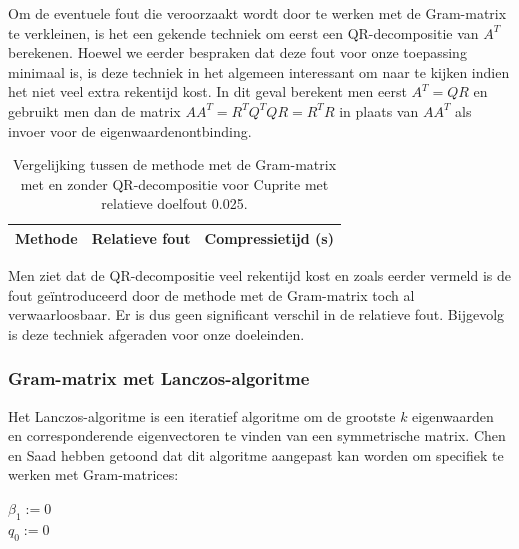 Om de eventuele fout die veroorzaakt wordt door te werken met de Gram-matrix te verkleinen, is het een gekende techniek om eerst een QR-decompositie van $A^T$ berekenen. Hoewel we eerder bespraken dat deze fout voor onze toepassing minimaal is, is deze techniek in het algemeen interessant om naar te kijken indien het niet veel extra rekentijd kost. In dit geval berekent men eerst $A^T = QR$ en gebruikt men dan de matrix $A A^T = R^T Q^T Q R = R^T R$ in plaats van $A A^T$ als invoer voor de eigenwaardenontbinding.\\

\begin{table}[H]
\centering
\begin{tabular}{|l|l|l|}
\hline
Methode & Relatieve fout & Compressietijd (s)\\ \hline

\end{tabular}
\caption{Vergelijking tussen de methode met de Gram-matrix met en zonder QR-decompositie voor Cuprite met relatieve doelfout 0.025.}
\end{table}

Men ziet dat de QR-decompositie veel rekentijd kost en zoals eerder vermeld is de fout ge\"introduceerd door de methode met de Gram-matrix toch al verwaarloosbaar. Er is dus geen significant verschil in de relatieve fout. Bijgevolg is deze techniek afgeraden voor onze doeleinden.

\subsubsection{Gram-matrix met Lanczos-algoritme}

Het Lanczos-algoritme \cite{ref:lanczos} is een iteratief algoritme om de grootste $k$ eigenwaarden en corresponderende eigenvectoren te vinden van een symmetrische matrix. Chen en Saad \cite{ref:saad} hebben getoond dat dit algoritme aangepast kan worden om specifiek te werken met Gram-matrices:\\

\begin{algorithm}[H]
$\beta_1 := 0$\\
$q_0 := 0$\\
\end{algorithm}

